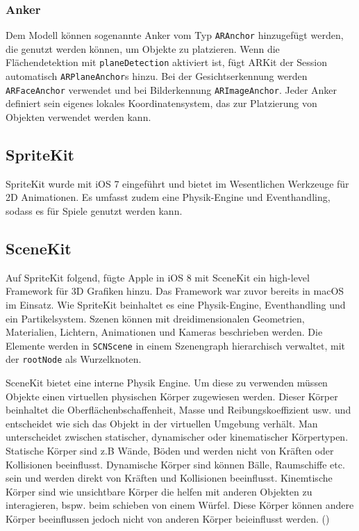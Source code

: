 
\subsubsection{Anker}
Dem Modell können sogenannte Anker vom Typ \texttt{ARAnchor} hinzugefügt werden, die genutzt werden können, um Objekte zu platzieren. Wenn die Flächendetektion mit \texttt{planeDetection} aktiviert ist, fügt ARKit der Session automatisch \texttt{ARPlaneAnchor}s hinzu. Bei der Gesichtserkennung werden \texttt{ARFaceAnchor} verwendet und bei Bilderkennung \texttt{ARImageAnchor}. Jeder Anker definiert sein eigenes lokales Koordinatensystem, das zur Platzierung von Objekten verwendet werden kann.


\subsection{SpriteKit}
SpriteKit wurde mit iOS 7 eingeführt und bietet im Wesentlichen Werkzeuge für 2D Animationen. Es umfasst zudem eine Physik-Engine und Eventhandling, sodass es für Spiele genutzt werden kann.


\subsection{SceneKit} \label{sub:scene-kit}
Auf SpriteKit folgend, fügte Apple in iOS 8 mit SceneKit ein high-level Framework für 3D Grafiken hinzu. Das Framework war zuvor bereits in macOS im Einsatz. Wie SpriteKit beinhaltet es eine Physik-Engine, Eventhandling und ein Partikelsystem. Szenen können mit dreidimensionalen Geometrien, Materialien, Lichtern, Animationen und Kameras beschrieben werden. Die Elemente werden in \texttt{SCNScene} in einem Szenengraph hierarchisch verwaltet, mit der \texttt{rootNode} als Wurzelknoten.

SceneKit bietet eine interne Physik Engine. Um diese zu verwenden müssen Objekte einen virtuellen physischen Körper zugewiesen werden. Dieser Körper beinhaltet die Oberflächenbschaffenheit, Masse und Reibungskoeffizient usw. und entscheidet wie sich das Objekt in der virtuellen Umgebung verhält. Man unterscheidet zwischen statischer, dynamischer oder kinematischer Körpertypen. Statische Körper sind z.B Wände, Böden und werden nicht von Kräften oder Kollisionen beeinflusst. Dynamische Körper sind können Bälle, Raumschiffe etc. sein und werden direkt von Kräften und Kollisionen beeinflusst. Kinemtische Körper sind wie unsichtbare Körper die helfen mit anderen Objekten zu interagieren, bspw. beim schieben von einem Würfel. Diese Körper können andere Körper beeinflussen jedoch nicht von anderen Körper beieinflusst werden. (\cite{arkit-physics})

